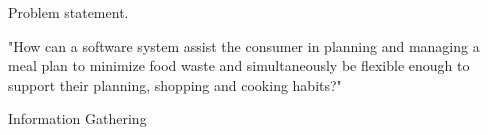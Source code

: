Problem statement.


"How can a software system assist the consumer in planning and managing a meal plan
to minimize food waste and simultaneously be flexible enough to support their planning, shopping and cooking habits?"

Information Gathering